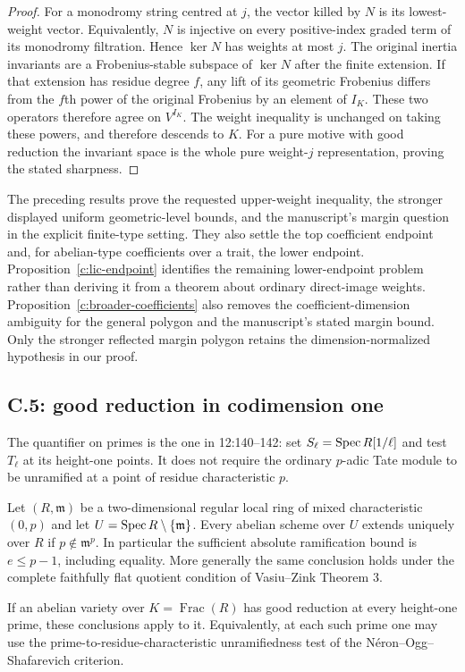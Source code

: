 \begin{proof}
For a monodromy string centred at $j$, the vector killed by $N$ is
its lowest-weight vector.  Equivalently, $N$ is injective on every
positive-index graded term of its monodromy filtration.  Hence
$\ker N$ has weights at most $j$.  The original inertia invariants
are a Frobenius-stable subspace of $\ker N$ after the finite
extension.  If that extension has residue degree $f$, any lift of
its geometric Frobenius differs from the $f$th power of the original
Frobenius by an element of $I_K$.  These two operators therefore
agree on $V^{I_K}$.  The weight inequality is unchanged
on taking these powers, and therefore descends to $K$.
For a pure motive with good reduction the invariant space is the
whole pure weight-$j$ representation, proving the stated sharpness.
\end{proof}


The preceding results prove the requested upper-weight inequality, the stronger displayed uniform geometric-level bounds, and the manuscript's margin question in the explicit finite-type setting. They also settle the top coefficient endpoint and, for abelian-type coefficients over a trait, the lower endpoint. Proposition~\ref{c:lic-endpoint} identifies the remaining lower-endpoint problem rather than deriving it from a theorem about ordinary direct-image weights. Proposition~\ref{c:broader-coefficients} also removes the coefficient-dimension ambiguity for the general polygon and the manuscript's stated margin bound. Only the stronger reflected margin polygon retains the dimension-normalized hypothesis in our proof.

\subsection{C.5: good reduction in codimension one}

The quantifier on primes is the one in 12:140--142: set $S_\ell=\operatorname{Spec} R[1/\ell]$ and test $T_\ell$ at its height-one points. It does not require the ordinary $p$-adic Tate module to be unramified at a point of residue characteristic $p$.

\begin{theorem}
\label{c:vz-positive}
Let $(R,\mathfrak m)$ be a two-dimensional regular local ring of mixed characteristic $(0,p)$ and let $U=\operatorname{Spec} R\setminus\{\mathfrak m\}$. Every abelian scheme over $U$ extends uniquely over $R$ if $p\notin\mathfrak m^p$. In particular the sufficient absolute ramification bound is $e\leq p-1$, including equality. More generally the same conclusion holds under the complete faithfully flat quotient condition of Vasiu--Zink Theorem 3.

If an abelian variety over $K=\operatorname{Frac}(R)$ has good reduction at every height-one prime, these conclusions apply to it. Equivalently, at each such prime one may use the prime-to-residue-characteristic unramifiedness test of the N\'eron--Ogg--Shafarevich criterion.
\end{theorem}

